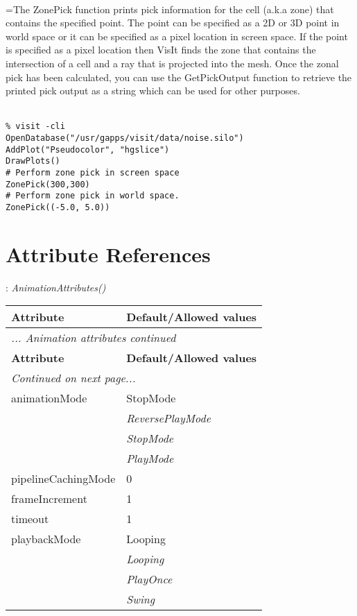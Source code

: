 \documentclass[10pt,a4paper]{report}
\begin{document}
 \\ 
\hangindent=\parindent The ZonePick function prints pick information for the cell (a.k.a zone) that contains the specified point. The point can be specified as a 2D or 3D point in world space or it can be specified as a pixel location in screen space. If the point is specified as a pixel location then VisIt finds the zone that contains the intersection of a cell and a ray that is projected into the mesh. Once the zonal pick has been calculated, you can use the GetPickOutput function to retrieve the printed pick output as a string which can be used for other purposes. \\[-3mm] 

\\[-6mm]
\begin{verbatim}% visit -cli
OpenDatabase("/usr/gapps/visit/data/noise.silo")
AddPlot("Pseudocolor", "hgslice")
DrawPlots()
# Perform zone pick in screen space
ZonePick(300,300)
# Perform zone pick in world space.
ZonePick((-5.0, 5.0))
\end{verbatim}
\newpage

\newpage
\chapter{Attribute References}


{}
: {\it AnimationAttributes() }\\[-3mm]

\begin{longtable}{ll}
{\bf Attribute} & {\bf Default/Allowed values} \\
\hline \hline
\endfirsthead
\multicolumn{2}{l}{{\it ... Animation attributes continued}} \\
{\bf Attribute} & {\bf Default/Allowed values} \\
\hline \hline
\endhead
\hline
\multicolumn{2}{l}{{\it Continued on next page...}} \\
\endfoot
\hline
\endlastfoot

animationMode  &  StopMode   \\
 & {\it  ReversePlayMode} \\
 & {\it  StopMode} \\
 & {\it  PlayMode} \\
pipelineCachingMode  &  0 \\
frameIncrement  &  1 \\
timeout  &  1 \\
playbackMode  &  Looping   \\
 & {\it  Looping} \\
 & {\it  PlayOnce} \\
 & {\it  Swing} \\
\end{longtable}
\end{document}
